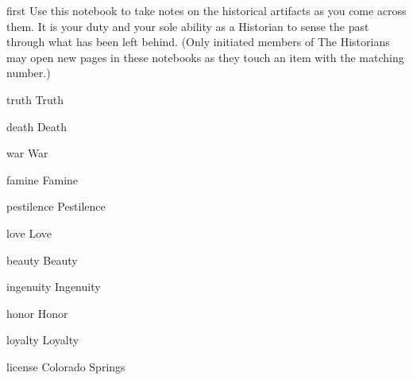 \documentclass[notebook]{Silversiders} %
\begin{document}
\startnotebook{\nHistorian{}}

\begin{page}{first}
Use this notebook to take notes on the historical artifacts as you come across them. It is your duty and your sole ability as a Historian to sense the past through what has been left behind. (Only initiated members of The Historians may open new pages in these notebooks as they touch an item with the matching number.)
\end{page}

\begin{page}[Item 00001]{truth}
Truth
\end{page}

\begin{page}[Item 00003]{death}
Death
\end{page}

\begin{page}[Item 00004]{war}
War
\end{page}

\begin{page}[Item 00005]{famine}
Famine
\end{page}

\begin{page}[Item 00006]{pestilence}
Pestilence
\end{page}

\begin{page}[Item 00007]{love}
Love
\end{page}

\begin{page}[Item 00011]{beauty}
Beauty
\end{page}

\begin{page}[Item 00013]{ingenuity}
Ingenuity
\end{page}

\begin{page}[Item 00015]{honor}
Honor
\end{page}

\begin{page}[Item 00017]{loyalty}
Loyalty
\end{page}

\begin{page}[Item 00018]{license}
Colorado Springs
\end{page}

\endnotebook
\end{document}
